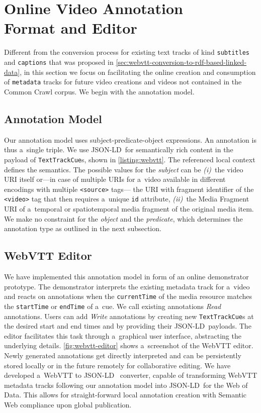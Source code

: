 \documentclass{sig-alternate}
\def\JSONLD{\mbox{JSON-LD}}
\begin{document}
\section{Online Video Annotation\\ Format and Editor}
\label{sec:online-video-annotation-format-and-editor}

Different from the conversion process for existing text tracks
of kind \texttt{subtitles} and \texttt{captions}
that was proposed in \autoref{sec:webvtt-conversion-to-rdf-based-linked-data},
in this section we focus on facilitating the online creation and consumption
of \texttt{metadata} tracks for future video creations
and videos not contained in the Common Crawl corpus.
We begin with the annotation model.

\subsection{Annotation Model}

Our annotation model uses subject-predicate-object expressions.
An annotation is thus a~single triple.
We use \JSONLD\ for semantically rich content
in the payload of \texttt{TextTrackCue}s, shown in
\autoref{listing:webvtt}.
The referenced local context defines the semantics.
The possible values for the \emph{subject} can be \emph{(i)}~the video
URI itself or---in case of multiple URIs for a~video available
in different encodings with multiple \texttt{<source>} tags---%
the URI with fragment identifier of the \texttt{<video>} tag
that then requires a~unique \texttt{id} attribute,
\emph{(ii)}~the Media Fragment URI of a~temporal or spatiotemporal
media fragment of the original media item.
We make no constraint for the \emph{object} 
and the \emph{predicate},
which determines the annotation type as outlined in the next subsection.

\subsection{WebVTT Editor}

We have implemented this annotation model
in form of an online demonstrator prototype.
The demonstrator interprets the existing metadata track for a~video
and reacts on annotations when the \texttt{currentTime}
of the media resource matches the
\texttt{startTime} or \texttt{endTime} of a~cue.
We call existing annotations \emph{Read} annotations.
Users can add \emph{Write} annotations
by creating new \texttt{TextTrackCue}s
at the desired start and end times
and by providing their \JSONLD~payloads.
The editor facilitates this task through a~graphical user interface, abstracting the underlying details.
\autoref{fig:webvtt-editor} shows a~screenshot of the WebVTT editor.
Newly generated annotations get directly interpreted
and can be persistently stored locally
or in the future remotely for collaborative editing.
We have developed a~WebVTT to \JSONLD~%
converter, capable of transforming WebVTT metadata tracks
following our annotation model
into \JSONLD~for the Web of Data.
This allows for straight-forward local annotation creation
with Semantic Web compliance upon global publication.
\end{document}
